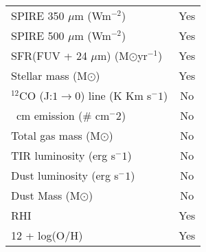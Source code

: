 \begin{table}
\begin{tabular}{ |l|c| }
SPIRE 350 $\mu$m (Wm$^{-2}$)& Yes\\
SPIRE 500 $\mu$m (Wm$^{-2}$)& Yes\\
SFR(FUV + 24 $\mu$m) (M$\odot$yr$^{-1}$) & Yes\\
Stellar mass (M$\odot$)& Yes\\
$^{12}$CO (J:$1\rightarrow0$) line (K Km s$^-1$) & No \\
\hi 21~cm emission ($\#$ cm$^-2$) & No \\
Total gas mass (M$\odot$) & No \\
TIR luminosity (erg s$^-1$) & No \\
Dust luminosity (erg s$^-1$) & No \\
Dust Mass (M$\odot$)& No\\
RHI & Yes\\
12 + log(O/H)& Yes\\
\hline
\end{tabular}
\end{table}